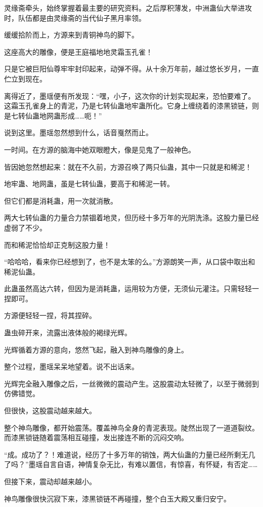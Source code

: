 \begin{this_body}
灵缘斋牵头，始终掌握着最主要的研究资料。之后厚积薄发，中洲蛊仙大举进攻时，队伍都是由灵缘斋的当代仙子黑月率领。

缓缓拾阶而上，方源来到青铜神鸟的脚下。

这座高大的雕像，便是王庭福地地灵霜玉孔雀！

只是它被巨阳仙尊牢牢封印起来，动弹不得。从十余万年前，越过悠长岁月，一直伫立到现在。

离得近了，墨瑶便有所发现：“嘿，小子，这次你的计划实现起来，恐怕要难了。这霜玉孔雀身上的青泥，乃是七转仙蛊地牢蛊所化。它身上缠绕着的漆黑锁链，则是七转仙蛊地网蛊形成……呃！”

说到这里。墨瑶忽然想到什么，话音戛然而止。

一时间。在方源的脑海中她双眼瞪大，像是见鬼了一般神色。

皆因她忽然想起来：就在不久前，方源召唤了两只仙蛊，其中一只就是和稀泥！

地牢蛊、地网蛊，虽是七转仙蛊，要高于和稀泥一转。

但它们都是消耗蛊，用一次就消散。

两大七转仙蛊的力量合力禁锢着地灵，但历经十多万年的光阴洗涤。这股力量已经虚弱了不少。

而和稀泥恰恰却正克制这股力量！

“哈哈哈，看来你已经想到了，也不是太笨的么。”方源朗笑一声，从口袋中取出和稀泥仙蛊。

此蛊虽然高达六转，但因为是消耗蛊，运用较为方便，无须仙元灌注。只需轻轻一捏即可。

方源便轻轻一捏，将其捏碎。

蛊虫碎开来，流露出液体般的褐绿光辉。

光辉循着方源的意向，悠然飞起，融入到神鸟雕像的身上。

整个过程，墨瑶呆呆地望着。说不出话来。

光辉完全融入雕像之后，一丝微微的震动产生。这股震动太轻微了，以至于微弱到仿佛错觉。

但很快，这股震动越来越大。

整个神鸟雕像，都开始震荡。覆盖神鸟全身的青泥表现。陡然出现了一道道裂纹。而漆黑锁链随着震荡相互碰撞，发出接连不断的沉闷交响。

“成。成功了？！难道说，经历了十多万年的销蚀，两大仙蛊的力量已经所剩无几了吗？”墨瑶自言自语，神情复杂无比，有难以置信，有惊喜，有怀疑，有否定……

但接下来，震动却越来越小。

神鸟雕像很快沉寂下来，漆黑锁链不再碰撞，整个白玉大殿又重归安宁。


\end{this_body}
